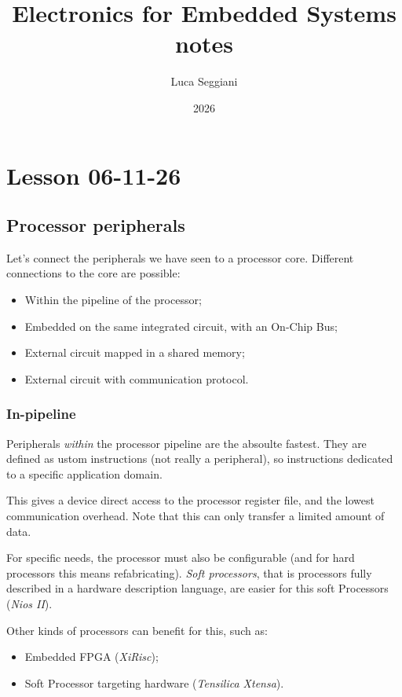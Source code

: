 \documentclass[a4paper,11pt]{article}
\title{Electronics for Embedded Systems notes}
\author{Luca Seggiani}
\date{2026}
\begin{document}
\section{Lesson 06-11-26}

\thispagestyle{empty}
\pagestyle{fancy}


\subsection{Processor peripherals}

Let's connect the peripherals we have seen to a processor core.
Different connections to the core are possible:
\begin{itemize}
	\item Within the pipeline of the processor;
	\item Embedded on the same integrated circuit, with an On-Chip Bus;
	\item External circuit mapped in a shared memory;
	\item External circuit with communication protocol.
\end{itemize}

\subsubsection{In-pipeline}

Peripherals \textit{within} the processor pipeline are the absoulte fastest.
They are defined as ustom instructions (not really a peripheral), so instructions dedicated to a specific application domain.

This gives a device direct access to the processor register file, and the lowest communication overhead.
Note that this can only transfer a limited amount of data.

For specific needs, the processor must also be configurable (and for hard processors this means refabricating).
\textit{Soft processors}, that is processors fully described in a hardware description language, are easier for this soft Processors (\textit{Nios II}).

Other kinds of processors can benefit for this, such as:
\begin{itemize}
	\item Embedded FPGA (\textit{XiRisc});
	\item Soft Processor targeting hardware (\textit{Tensilica Xtensa}).
\end{itemize}
\end{document}
